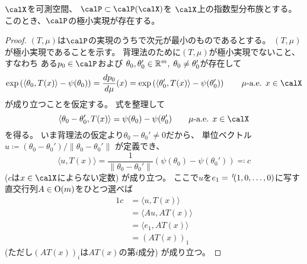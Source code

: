 \documentclass[report]{jlreq}
\begin{document}
\begin{theorem}[極小実現の存在]
    $\calX$を可測空間、
    $\calP \subset \calP(\calX)$を
    $\calX$上の指数型分布族とする。
    このとき、$\calP$の極小実現が存在する。
\end{theorem}

\begin{proof}
    $(T, \mu)$は$\calP$の実現のうちで次元が最小のものであるとする。
    $(T, \mu)$が極小実現であることを示す。
    背理法のために$(T, \mu)$が極小実現でないこと、すなわち
    ある$p_0 \in \calP$および
    $\theta_0, \theta_0' \in \mathbb{R}^m, \; \theta_0 \neq \theta_0'$が存在して
    \begin{equation}
        \exp\myparen{\langle \theta_0, T(x) \rangle - \psi(\theta_0)}
            = \dd[p_0]{\mu}(x)
            = \exp\myparen{\langle \theta_0', T(x) \rangle - \psi(\theta_0')}
            \qquad
            \text{$\mu$-a.e. $x \in \calX$}
    \end{equation}
    が成り立つことを仮定する。
    式を整理して
    \begin{equation}
        \langle \theta_0 - \theta_0', T(x) \rangle
            = \psi(\theta_0) - \psi(\theta_0')
            \qquad
            \text{$\mu$-a.e. $x \in \calX$}
    \end{equation}
    を得る。
    いま背理法の仮定より$\theta_0 - \theta_0' \neq 0$だから、
    単位ベクトル$u \coloneqq (\theta_0 - \theta_0') / \|\theta_0 - \theta_0'\|$
    が定義でき、
    \begin{equation}
        \langle u, T(x) \rangle
            = \frac{1}{\|\theta_0 - \theta_0'\|}
                (\psi(\theta_0) - \psi(\theta_0'))
            \eqqcolon c
    \end{equation}
    ($c$は$x \in \calX$によらない定数)
    が成り立つ。
    ここで$u$を$e_1 = \,{}^{t}\!(1, 0, \dots, 0)$に写す直交行列$A \in \operatorname{\mathrm{O}}(m)$をひとつ選べば
    \begin{alignat}{1}
        c
            &= \langle u, T(x) \rangle \\
            &= \langle Au, AT(x) \rangle \\
            &= \langle e_1, AT(x) \rangle \\
            &= (AT(x))_1
    \end{alignat}
    (ただし$(AT(x))_i$は$AT(x)$の第$i$成分)
    が成り立つ。


\end{proof}
\end{document}
